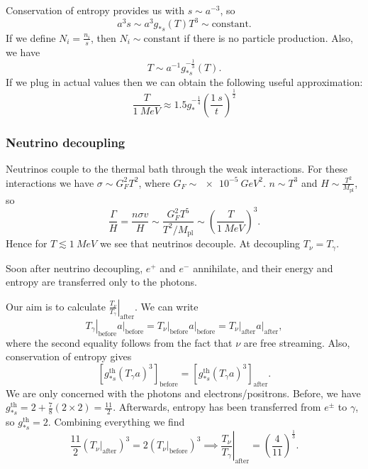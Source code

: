 \documentclass{jknotes}
\begin{document}
Conservation of entropy provides us with \(s\sim a^{-3}\), so
\begin{equation}
    a^3s \sim a^3g_{*s}(T)T^3 \sim \text{constant}.
\end{equation}
If we define \(N_i = \frac{n_i}{s}\), then \(N_i\sim\text{constant}\) if there is no particle production. Also, we have
\begin{equation}
    T \sim a^{-1}g_{*s}^{-\frac13}(T).
\end{equation}
If we plug in actual values then we can obtain the following useful approximation:
\begin{equation}
    \frac{T}{\SI{1}{MeV}} \approx 1.5 g_*^{-\frac14} \left(\frac{\SI{1}{s}}{t}\right)^{\frac12}
\end{equation}

\subsubsection*{Neutrino decoupling}
Neutrinos couple to the thermal bath through the weak interactions. For these interactions we have \(\sigma \sim G_F^2T^2\), where \(G_F\sim \SI{e-5}{GeV^2}\). \(n\sim T^3\) and \(H\sim \frac{T^2}{M_{\text{pl}}}\), so
\begin{equation}
    \frac{\Gamma}{H} = \frac{n\sigma v}{H} \sim \frac{G_F^2T^5}{T^2/M_{\text{pl}}} \sim \left(\frac{T}{\SI{1}{MeV}}\right)^3.
\end{equation}
Hence for \(T\lesssim \SI{1}{MeV}\) we see that neutrinos decouple. At decoupling \(T_\nu = T_\gamma\).

Soon after neutrino decoupling, \(e^+\) and \(e^-\) annihilate, and their energy and entropy are transferred only to the photons.

Our aim is to calculate \(\left.\frac{T_\nu}{T_\gamma}\right|_{\text{after}}\). We can write
\begin{equation}
    \left.T_\gamma\right|_{\text{before}} \left.a\right|_{\text{before}} =
    \left.T_\nu\right|_{\text{before}} \left.a\right|_{\text{before}} =
    \left.T_\nu\right|_{\text{after}} \left.a\right|_{\text{after}} ,
\end{equation}
where the second equality follows from the fact that \(\nu\) are free streaming. Also, conservation of entropy gives
\begin{equation}
    \left[g_{*s}^{\text{th}}(T_\gamma a)^3\right]_{\text{before}} = 
    \left[g_{*s}^{\text{th}}(T_\gamma a)^3\right]_{\text{after}}.
\end{equation}
We are only concerned with the photons and electrons/positrons. Before, we have \(g_{*s}^{\text{th}} = 2 + \frac78(2\times2) = \frac{11}2\). Afterwards, entropy has been transferred from \(e^\pm\) to \(\gamma\), so \(g_{*s}^{\text{th}} = 2\). Combining everything we find
\begin{equation}
    \frac{11}2\left(\left.T_\nu\right|_{\text{after}}\right)^3
    =
    2\left(\left.T_\nu\right|_{\text{before}}\right)^3 
    \implies
    \left.\frac{T_\nu}{T_\gamma}\right|_{\text{after}} = \left(\frac4{11}\right)^{\frac13}.
\end{equation}
\end{document}
